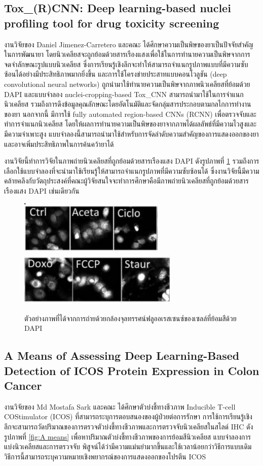 \documentclass[12pt,oneside,openright,a4paper]{cpe-thai-project}
\begin{document}
\subsection{Tox\_(R)CNN: Deep learning-based nuclei profiling tool for drug toxicity screening}
งานวิจัยของ  Daniel Jimenez-Carretero และคณะ \cite{29} ได้ศึกษาความเป็นพิษของยาเป็นปัจจัยสำคัญในการพัฒนายา โดยนิวเคลียสจะถูกย้อมด้วยสารเรืองแสงเพื่อใช้ในการทำนายความเป็นพิษจากการจดจำลักษณะรูปแบบนิวเคลียส  ซึ่งการเรียนรู้เชิงลึกจะทำให้สามารถจำแนกรูปภาพแบบที่มีความซับซ้อนได้อย่างมีประสิทธิภาพมากยิ่งขึ้น และการใช้โครงข่ายประสาทแบบคอนโวลูชัน (deep convolutional neural networks) ถูกนำมาใช้ทำนายความเป็นพิษจากภาพนิวเคลียสที่ย้อมด้วย DAPI และแบบจำลอง nuclei-cropping-based Tox\_CNN สามารถนำมาใช้ในการจำแนกนิวเคลียส รวมถึงการดึงข้อมูลคุณลักษณะโดยอัตโนมัติและจัดกลุ่มสารประกอบตามกลไกการทำงานของยา นอกจากนี้ มีการใช้ fully automated region-based CNNs (RCNN) เพื่อตรวจจับและทำการจำแนกนิวเคลียส โดยให้ผลการทำนายความเป็นพิษของยาจากภาพได้ผลลัพธ์ที่มีความไวสูงและมีความจำเพาะสูง แบบจำลองนี้สามารถนำมาใช้สำหรับการจัดลำดับความสำคัญของการแสดงออกของยา และอาจเพิ่มประสิทธิภาพในการค้นคว้ายาได้ 

งานวิจัยนี้ทำการวิจัยในภาพถ่ายนิวเคลียสที่ถูกย้อมด้วยสารเรืองแสง DAPI ดังรูปภาพที่ \ref{fig:Tox_rcnn} รวมถึงการเลือกใช้แบบจำลองที่จะนำมาใช้เรียนรู้ให้สามารถจำแนกรูปภาพที่มีความซับซ้อนได้ ซึ่งงานวิจัยนี้มีความคล้ายคลึงกับวัตถุประสงค์ที่คณะผู้วิจัยสนใจจะทำการศึกษาคือมีภาพถ่ายนิวเคลียสที่ถูกย้อมด้วยสารเรืองแสง DAPI เช่นเดียวกัน
 \begin{figure}[!h]
    \centering
    \includegraphics[scale=1]{images/paper-Tox_N(1).png} \\
    \includegraphics[scale=0.9]{images/paper-Tox_N(2).png}
    \caption[รูปตัวอย่างจากเปเปอร์ Tox\_rcnn]{ตัวอย่างภาพที่ได้จากการถ่ายด้วยกล้องจุลทรรศน์ฟลูออเรสเซนซ์ของเซลล์ที่ย้อมสีด้วย DAPI}
    \label{fig:Tox_rcnn}
\end{figure}
\subsection{A Means of Assessing Deep Learning-Based Detection of ICOS Protein Expression in Colon Cancer}
งานวิจัยของ Md Mostafa Sark และคณะ \cite{30} ได้ศึกษาตัวบ่งชี้ทางชีวภาพ Inducible T-cell COStimulator (ICOS) ที่สามารถระบุการตอบสนองของผู้ป่วยต่อการรักษา การใช้การเรียนรู้เชิงลึกจะสามารถวัดปริมาณของการตรวจตัวบ่งชี้ทางชีวภาพและการตรวจจับนิวเคลียสในสไลด์ IHC ดังรูปภาพที่ \ref{fig:A means}  เพื่อหาปริมาณตัวบ่งชี้ทางชีวภาพของการย้อมสีนิวเคลียส แบบจำลองการแบ่งนิวเคลียสและการตรวจจับ พิสูจน์ได้ว่ามีความแม่นยำมากขึ้นและใช้เวลาน้อยกว่าวิธีการแบบเดิม วิธีการนี้สามารถระบุความหมายเชิงพยากรณ์ของการแสดงออกของโปรตีน ICOS 
\end{document}
